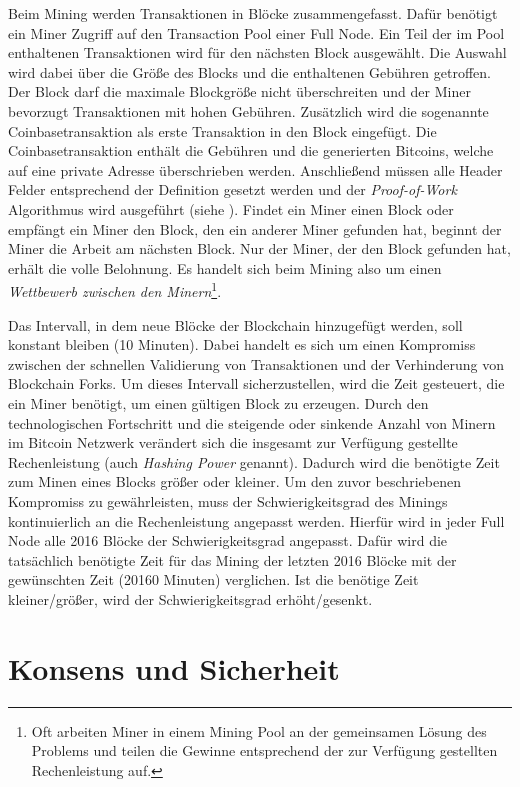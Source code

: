 \documentclass[ngerman,runningheads,a4paper]{llncs}[2018/03/10]
\begin{document}
Beim Mining werden Transaktionen in Blöcke zusammengefasst. Dafür benötigt ein Miner Zugriff auf den Transaction Pool einer Full Node. Ein Teil der im Pool enthaltenen Transaktionen wird für den nächsten Block ausgewählt. Die Auswahl wird dabei über die Größe des Blocks und die enthaltenen Gebühren getroffen. Der Block darf die maximale Blockgröße nicht überschreiten und der Miner bevorzugt Transaktionen mit hohen Gebühren. Zusätzlich wird die sogenannte Coinbasetransaktion als erste Transaktion in den Block eingefügt. Die Coinbasetransaktion enthält die Gebühren und die generierten Bitcoins, welche auf eine private Adresse überschrieben werden. Anschließend müssen alle Header Felder entsprechend der Definition gesetzt werden und der \textit{Proof-of-Work} Algorithmus wird ausgeführt (siehe ). Findet ein Miner einen Block oder empfängt ein Miner den Block, den ein anderer Miner gefunden hat, beginnt der Miner die Arbeit am nächsten Block. Nur der Miner, der den Block gefunden hat, erhält die volle Belohnung. Es handelt sich beim Mining also um einen \textit{Wettbewerb zwischen den Minern}\footnote{Oft arbeiten Miner in einem Mining Pool an der gemeinsamen Lösung des Problems und teilen die Gewinne entsprechend der zur Verfügung gestellten Rechenleistung auf.}.

Das Intervall, in dem neue Blöcke der Blockchain hinzugefügt werden, soll konstant bleiben (10 Minuten). Dabei handelt es sich um einen Kompromiss zwischen der schnellen Validierung von Transaktionen und der Verhinderung von Blockchain Forks. Um dieses Intervall sicherzustellen, wird die Zeit gesteuert, die ein Miner benötigt, um einen gültigen Block zu erzeugen. Durch den technologischen Fortschritt und die steigende oder sinkende Anzahl von Minern im Bitcoin Netzwerk verändert sich die insgesamt zur Verfügung gestellte Rechenleistung (auch \textit{Hashing Power} genannt). Dadurch wird die benötigte Zeit zum Minen eines Blocks größer oder kleiner. Um den zuvor beschriebenen Kompromiss zu gewährleisten, muss der Schwierigkeitsgrad des Minings kontinuierlich an die Rechenleistung angepasst werden. Hierfür wird in jeder Full Node alle 2016 Blöcke der Schwierigkeitsgrad angepasst. Dafür wird die tatsächlich benötigte Zeit für das Mining der letzten 2016 Blöcke mit der gewünschten Zeit (20160 Minuten) verglichen. Ist die benötige Zeit kleiner/größer, wird der Schwierigkeitsgrad erhöht/gesenkt.

\section{Konsens und Sicherheit}\label{sec:konsens}
\end{document}
